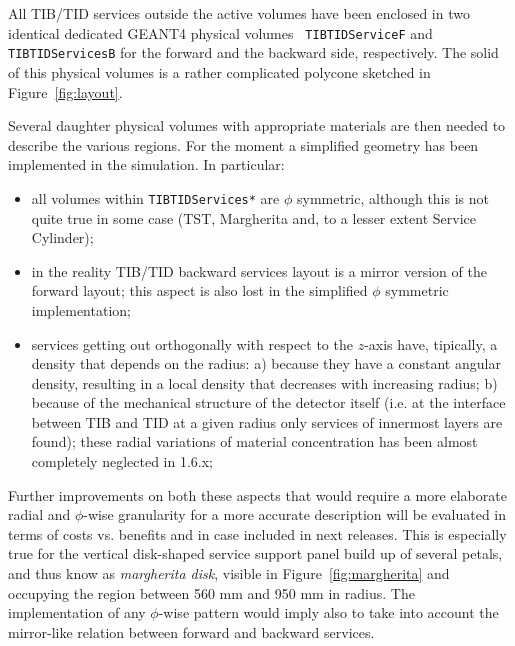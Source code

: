 
All TIB/TID services outside the active volumes have been
enclosed in two identical dedicated GEANT4 physical volumes {\tt
  TIBTIDServiceF} and {\tt TIBTIDServicesB} for the forward and the
backward side, respectively. The solid of this physical volumes is a
rather complicated polycone sketched in Figure~\ref{fig:layout}. 

Several daughter physical volumes with appropriate materials are then needed to describe the various regions. For the moment a simplified geometry has been implemented in the simulation. In particular:
\begin{itemize}
\item all volumes within {\tt TIBTIDServices*} are $\phi$ symmetric, although this is not quite true in some case (TST, Margherita and, to a lesser extent Service Cylinder);
\item in the reality TIB/TID backward services layout is a mirror version of the forward layout; this aspect is also lost in the simplified $\phi$ symmetric implementation;
\item services getting out orthogonally with respect to the $z$-axis have, tipically, a density that depends on the radius: a) because they have a constant angular density, resulting in a local density that decreases with increasing radius; b) because of the mechanical structure of the detector itself (i.e. at the interface between TIB and TID at a given radius only services of innermost layers are found); these radial variations of material concentration has been almost completely neglected in 1.6.x;
\end{itemize}

Further improvements on both these aspects that would require a more elaborate radial and $\phi$-wise  granularity for a more accurate description will be evaluated in terms of costs vs. benefits and in case included in next releases. This is especially true for the vertical disk-shaped service support panel build up of several petals, and thus know as  {\em margherita disk}, visible in Figure~\ref{fig:margherita} and occupying the region between 560 mm and 950 mm in radius. The implementation of any $\phi$-wise pattern would imply also to take into account the mirror-like relation between forward and backward services.

